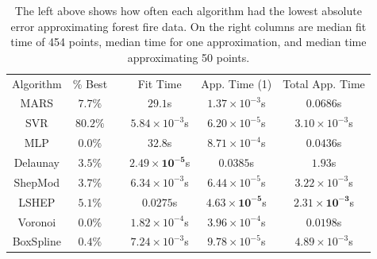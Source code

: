 \documentclass[smallextended,final]{svjour3}       %
\begin{document}
\begin{appendix}
\begin{table}
  \centering
  \begin{tabular}{|c|c| c |c|c|c|}
    \cline{1-2}\cline{4-6}
    Algorithm & \% Best &  & Fit Time & App. Time (1) & Total App. Time\\
    \cline{1-2}\cline{4-6}
    MARS & $\mathit{7.7}\%$ &  & $29.1$s & $1.37 \times 10^{-3}$s & $0.0686$s\\
    SVR & $\mathbf{80.2}\%$ &  & $5.84 \times 10^{-3}$s & $\mathit{6.20 \times 10^{-5}}$s & $\mathit{3.10 \times 10^{-3}}$s\\
    MLP & $0.0\%$ &  & $32.8$s & $8.71 \times 10^{-4}$s & $0.0436$s\\
    Delaunay & $3.5\%$ &  & $\mathbf{2.49 \times 10^{-5}}$s & $0.0385$s & $1.93$s\\
    ShepMod & $3.7\%$ &  & $6.34 \times 10^{-3}$s & $6.44 \times 10^{-5}$s & $3.22 \times 10^{-3}$s\\
    LSHEP & $5.1\%$ &  & $0.0275$s & $\mathbf{4.63 \times 10^{-5}}$s & $\mathbf{2.31 \times 10^{-3}}$s\\
    Voronoi & $0.0\%$ &  & $\mathit{1.82 \times 10^{-4}}$s & $3.96 \times 10^{-4}$s & $0.0198$s\\
    BoxSpline & $0.4\%$ &  & $7.24 \times 10^{-3}$s & $9.78 \times 10^{-5}$s & $4.89 \times 10^{-3}$s\\
    \cline{1-2}\cline{4-6}
  \end{tabular}
  \caption{The left above shows how often each algorithm had the lowest absolute error approximating forest fire data. On the right columns are median fit time of 454 points, median time for one approximation, and median time approximating 50 points.}
  \label{table:best-forest-fire}
\end{table}



\end{appendix}
\end{document}
